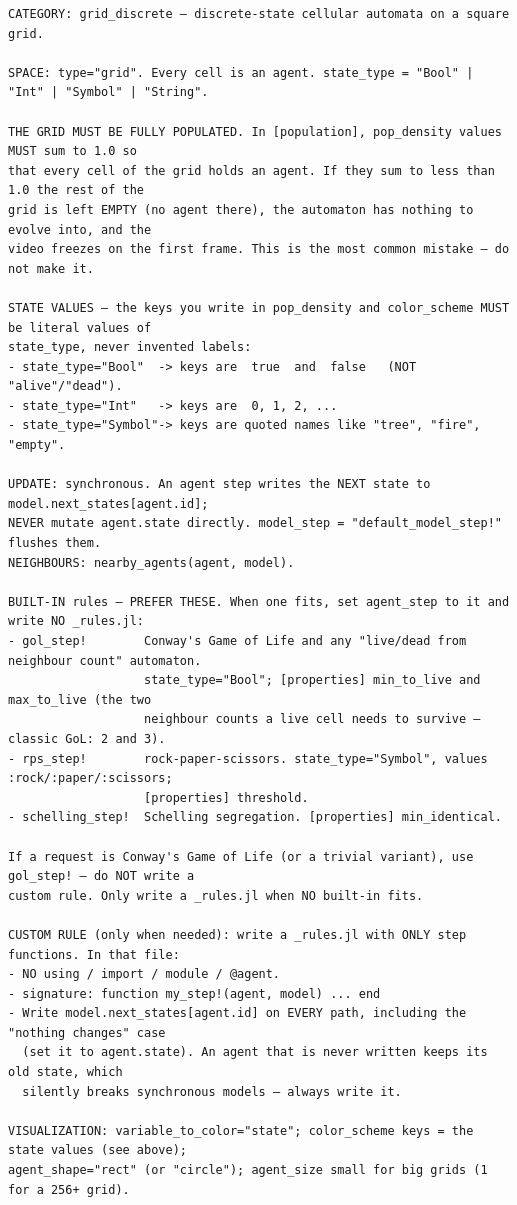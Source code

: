 \documentclass[runningheads]{llncs}
\begin{document}
\begin{lstlisting}[style=cellprompt]
CATEGORY: grid_discrete — discrete-state cellular automata on a square grid.

SPACE: type="grid". Every cell is an agent. state_type = "Bool" | "Int" | "Symbol" | "String".

THE GRID MUST BE FULLY POPULATED. In [population], pop_density values MUST sum to 1.0 so
that every cell of the grid holds an agent. If they sum to less than 1.0 the rest of the
grid is left EMPTY (no agent there), the automaton has nothing to evolve into, and the
video freezes on the first frame. This is the most common mistake — do not make it.

STATE VALUES — the keys you write in pop_density and color_scheme MUST be literal values of
state_type, never invented labels:
- state_type="Bool"  -> keys are  true  and  false   (NOT "alive"/"dead").
- state_type="Int"   -> keys are  0, 1, 2, ...
- state_type="Symbol"-> keys are quoted names like "tree", "fire", "empty".

UPDATE: synchronous. An agent step writes the NEXT state to model.next_states[agent.id];
NEVER mutate agent.state directly. model_step = "default_model_step!" flushes them.
NEIGHBOURS: nearby_agents(agent, model).

BUILT-IN rules — PREFER THESE. When one fits, set agent_step to it and write NO _rules.jl:
- gol_step!        Conway's Game of Life and any "live/dead from neighbour count" automaton.
                   state_type="Bool"; [properties] min_to_live and max_to_live (the two
                   neighbour counts a live cell needs to survive — classic GoL: 2 and 3).
- rps_step!        rock-paper-scissors. state_type="Symbol", values :rock/:paper/:scissors;
                   [properties] threshold.
- schelling_step!  Schelling segregation. [properties] min_identical.

If a request is Conway's Game of Life (or a trivial variant), use gol_step! — do NOT write a
custom rule. Only write a _rules.jl when NO built-in fits.

CUSTOM RULE (only when needed): write a _rules.jl with ONLY step functions. In that file:
- NO using / import / module / @agent.
- signature: function my_step!(agent, model) ... end
- Write model.next_states[agent.id] on EVERY path, including the "nothing changes" case
  (set it to agent.state). An agent that is never written keeps its old state, which
  silently breaks synchronous models — always write it.

VISUALIZATION: variable_to_color="state"; color_scheme keys = the state values (see above);
agent_shape="rect" (or "circle"); agent_size small for big grids (1 for a 256+ grid).


\end{lstlisting}
\end{document}
